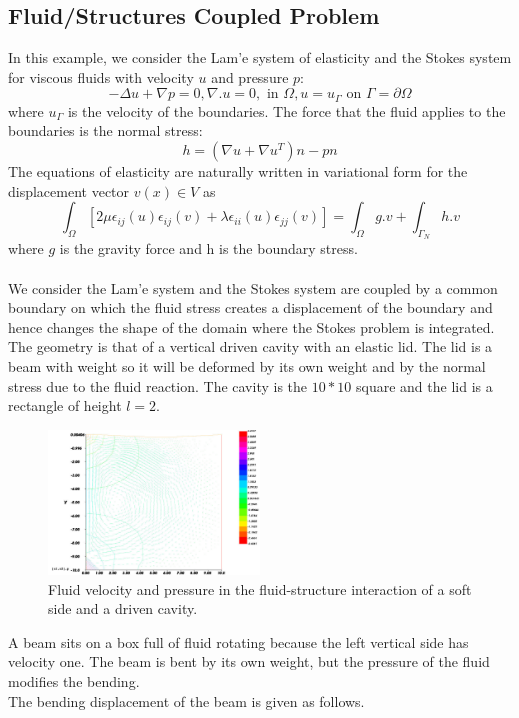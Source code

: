 \documentclass[notitlepage,a4paper,fleqn,9pt]{icmfarticle}
\begin{document}
\begin{multicols}{2}
\subsection{Fluid/Structures Coupled Problem}
In this example, we consider the Lam'e system of elasticity and the Stokes system for viscous fluids with velocity $u$ and pressure $p$:
$$-\Delta u + \nabla p = 0, \nabla .u = 0, \text{ in } \Omega, u = u_\Gamma \text{ on } \Gamma = \partial \Omega$$
where $u_\Gamma$ is the velocity of the boundaries. The force that the fluid applies to the boundaries is the normal stress:
$$h = (\nabla u + \nabla u^T)n - pn$$
The equations of elasticity are naturally written in variational form for the displacement vector $v(x)\in V$ as
$$\int_\Omega [2\mu \epsilon_{ij}(u)\epsilon_{ij}(v) + \lambda\epsilon_{ii}(u)\epsilon_{jj}(v)] = \int_\Omega g.v + \int_{\Gamma_N}h.v$$
where $g$ is the gravity force and h is the boundary stress.\\
\\
We consider the Lam'e system and the Stokes system are coupled by a common boundary on which the fluid stress creates a displacement of the boundary and hence changes the shape of the domain where the Stokes problem is integrated. The geometry is that of a vertical driven cavity with an elastic lid. The lid is a beam with weight so it will be deformed by its own weight and by the normal stress due to the fluid reaction. The cavity is the $10 * 10$ square and the lid is a rectangle of height $l = 2$. \\

\begin{figure}[H]
  \begin{center}
    \includegraphics[width=0.5\textwidth]{4-6-1.pdf}
  \end{center}
  \caption{Fluid velocity and pressure in the fluid-structure interaction of a soft side and a driven cavity.}
  \label{fig-dg-neighbor}
\end{figure}

A beam sits on a box full of fluid rotating because the left vertical side has velocity one. The beam is bent by its own weight, but the pressure of the fluid modifies the bending. \\
The bending displacement of the beam is given as follows. \\


\end{multicols}
\end{document}
